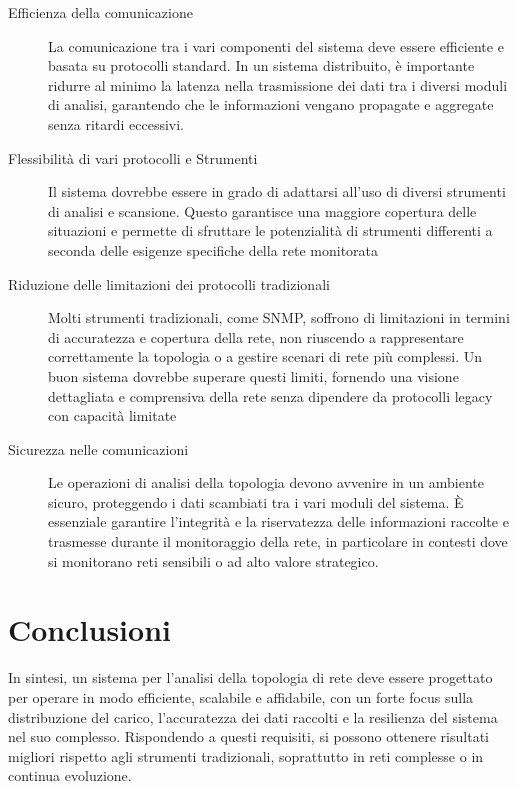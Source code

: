 \documentclass[target=bach,aauheader=,style=]{thud}
\begin{document}
\begin{description}
  \item[Efficienza della comunicazione]
  La comunicazione tra i vari componenti del sistema deve essere efficiente e basata su protocolli standard. In un sistema distribuito, è importante ridurre al minimo la latenza nella trasmissione dei dati tra i diversi moduli di analisi, garantendo che le informazioni vengano propagate e aggregate senza ritardi eccessivi.

\item[Flessibilità di vari protocolli e Strumenti]
    Il sistema dovrebbe essere in grado di adattarsi all'uso di diversi strumenti di analisi e scansione. Questo garantisce una maggiore copertura delle situazioni e permette di sfruttare le potenzialità di strumenti differenti a seconda delle esigenze specifiche della rete monitorata

  \item[Riduzione delle limitazioni dei protocolli tradizionali]
  Molti strumenti tradizionali, come SNMP, soffrono di limitazioni in termini di accuratezza e copertura della rete, non riuscendo a rappresentare correttamente la topologia o a gestire scenari di rete più complessi. Un buon sistema dovrebbe superare questi limiti, fornendo una visione dettagliata e comprensiva della rete senza dipendere da protocolli legacy con capacità limitate

  \item[Sicurezza nelle comunicazioni]
  Le operazioni di analisi della topologia devono avvenire in un ambiente sicuro, proteggendo i dati scambiati tra i vari moduli del sistema. È essenziale garantire l'integrità e la riservatezza delle informazioni raccolte e trasmesse durante il monitoraggio della rete, in particolare in contesti dove si monitorano reti sensibili o ad alto valore strategico.

\end{description}

\section{Conclusioni}

In sintesi, un sistema per l'analisi della topologia di rete deve essere progettato per operare in modo efficiente, scalabile e affidabile, con un forte focus sulla distribuzione del carico, l'accuratezza dei dati raccolti e la resilienza del sistema nel suo complesso. Rispondendo a questi requisiti, si possono ottenere risultati migliori rispetto agli strumenti tradizionali, soprattutto in reti complesse o in continua evoluzione.
\end{document}
